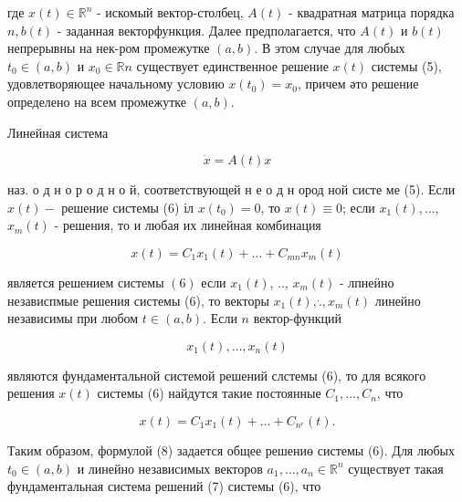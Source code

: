 \documentclass[10pt]{article}
\begin{document}
где $x(t) \in \mathbb{R}^{n}$ - искомый вектор-столбец, $A(t)$ - квадратная матрица порядка $n, b(t)$ - заданная векторфункция. Далее предполагается, что $A(t)$ и $b(t)$ непрерывны на нек-ром промежутке $(a, b)$. В этом случае для любых $t_{0} \in(a, b)$ и $x_{0} \in \mathbb{R} n$ существует единственное решение $x(t)$ системы (5), удовлетворяющее начальному условию $x\left(t_{0}\right)=x_{0}$, причем әто решение определено на всем промежутке $(a, b)$.



Линейная система



\[

\dot{x}=A(t) x

\]



наз. о д н о р о д н о й, соответствующей н е о д н ород ной систе ме (5). Если $x(t)-$ решение системы (6) іл $x\left(t_{0}\right)=0$, то $x(t) \equiv 0$; если $x_{1}(t), \ldots$, $x_{m}(t)$ - решения, то и любая их линейная комбинация



\[

x(t)=C_{1} x_{1}(t)+\ldots+C_{m n} x_{m}(t)

\]



является решением системы $(6)$ если $x_{1}(t)$, .., $x_{m}(t)$ - лпнеӥно независпмые решения системы (6), то векторы $x_{1}(t), \dot{.}, x_{m}(t)$ линейно независимы при любом $t \in(a, b)$. Если $n$ вектор-функций



\[

x_{1}(t), \ldots, x_{n}(t)

\]



являются фундаментальной системой решений слстемы (6), то для всякого решения $x(t)$ системы (6) найдутся такие постоянные $C_{1}, \ldots, C_{n}$, что



\[

x(t)=C_{1} x_{1}(t)+\ldots+C_{n^{r}}(t) .

\]



Таким образом, формулой (8) задается общее решениө системы (6). Для любых $t_{0} \in(a, b)$ и линейно независимых векторов $a_{1}, \ldots, a_{n} \in \mathbb{R}^{n}$ существует такая фундаментальная система решений (7) системы (6), что
\end{document}
